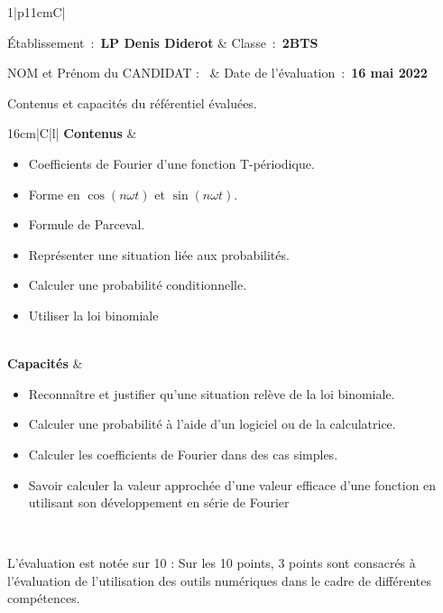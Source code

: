 \documentclass[11pt]{article}
\newcommand{\etablissement}{LP Denis Diderot}
\newcommand{\classe}{2BTS}
\newcommand{\datedeval}{16 mai 2022}
\newcommand{\contenus}{
  \begin{minipage}[c]{12.5cm}
    \begin{itemize}
      \item \rule{0ex}{2.5ex} Coefficients de Fourier d'une fonction T-périodique.
      \item Forme en $\cos(n\omega t)$ et $\sin(n\omega t)$.
      \item Formule de Parceval.  
      \item Représenter une situation liée aux probabilités.
      \item Calculer une probabilité conditionnelle.
      \item Utiliser la loi binomiale\rule[-1.5ex]{0ex}{3ex} 
      \end{itemize}
    \end{minipage}
  }
\newcommand{\capacites}{
  \begin{minipage}[c]{12.5cm}
    \begin{itemize}
    \item \rule{0ex}{2.5ex}Reconnaître et justifier qu'une situation relève de la loi binomiale.
    \item Calculer une probabilité à l'aide d'un logiciel ou de la calculatrice.
    \item Calculer les coefficients de Fourier dans des cas simples.
    \item Savoir calculer la valeur approchée d'une valeur efficace d'une
fonction en utilisant son développement en série de Fourier  
\rule[-1.5ex]{0ex}{3ex}
    \end{itemize}
    \end{minipage}
  }
\begin{document}
\bigskip


\normalsize

\noindent\begin{tabularx}{1\linewidth}{|p{11cm}C|}
  \hline
  \rule{0ex}{3ex}Établissement~:~\textbf{{\etablissement}} & Classe~:~\textbf{\classe}\\
 \rule[-1ex]{0ex}{4ex} NOM et Prénom du CANDIDAT : \ \dotfill & Date de l'évaluation~:~\textbf{\datedeval}\\
 \hline
\end{tabularx}
\bigskip




\begin{center}
  Contenus et capacités du référentiel évaluées.\\
  \begin{tabularx}{16cm}{|C|l|}
    \hline
    \textbf{Contenus} &
    \contenus\\
    \hline 
    \textbf{Capacités} &
    \capacites  \\

    \hline
  \end{tabularx}
\end{center}

\noindent{}

\bigskip


L'évaluation est notée sur 10 : Sur les 10 points, 3 points sont consacrés à l'évaluation de l'utilisation des outils numériques dans le cadre de
différentes compétences.

\begin{center}
\end{center}
\end{document}
